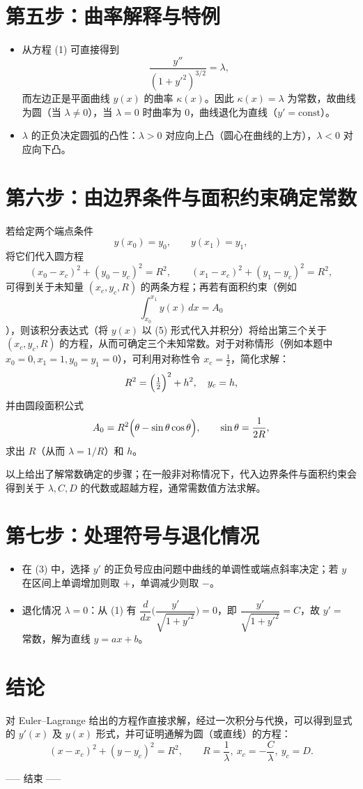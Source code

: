 \documentclass[11pt]{article}
\begin{document}
\section*{第五步：曲率解释与特例}
\begin{itemize}
  \item 从方程 (1) 可直接得到
  \[
  \frac{y''}{(1+y'^2)^{3/2}}=\lambda,
  \]
  而左边正是平面曲线 $y(x)$ 的曲率 $\kappa(x)$。因此 $\kappa(x)=\lambda$ 为常数，故曲线为圆（当 $\lambda\neq0$），当 $\lambda=0$ 时曲率为 $0$，曲线退化为直线（$y'=\text{const}$）。
  \item $\lambda$ 的正负决定圆弧的凸性：$\lambda>0$ 对应向上凸（圆心在曲线的上方），$\lambda<0$ 对应向下凸。
\end{itemize}

\section*{第六步：由边界条件与面积约束确定常数}
若给定两个端点条件
\[
y(x_0)=y_0,\qquad y(x_1)=y_1,
\]
将它们代入圆方程
\[
(x_0-x_c)^2 + (y_0-y_c)^2 = R^2,
\qquad
(x_1-x_c)^2 + (y_1-y_c)^2 = R^2,
\]
可得到关于未知量 $(x_c,y_c,R)$ 的两条方程；再若有面积约束（例如
\[
\int_{x_0}^{x_1} y(x)\,dx = A_0
\]
），则该积分表达式（将 $y(x)$ 以 (5) 形式代入并积分）将给出第三个关于 $(x_c,y_c,R)$ 的方程，从而可确定三个未知常数。对于对称情形（例如本题中 $x_0=0,x_1=1,y_0=y_1=0$），可利用对称性令 $x_c=\tfrac{1}{2}$，简化求解：
\[
R^2=\Bigl(\tfrac{1}{2}\Bigr)^2 + h^2,\quad y_c=h,
\]
并由圆段面积公式
\[
A_0 = R^2\Bigl(\theta - \sin\theta\cos\theta\Bigr),\qquad \sin\theta=\frac{1}{2R},
\]
求出 $R$（从而 $\lambda=1/R$）和 $h$。
\medskip

\noindent 以上给出了解常数确定的步骤；在一般非对称情况下，代入边界条件与面积约束会得到关于 $\lambda,C,D$ 的代数或超越方程，通常需数值方法求解。

\section*{第七步：处理符号与退化情况}
\begin{itemize}
  \item 在 (3) 中，选择 $y'$ 的正负号应由问题中曲线的单调性或端点斜率决定；若 $y$ 在区间上单调增加则取 $+$，单调减少则取 $-$。
  \item 退化情况 $\lambda=0$：从 (1) 有 $\dfrac{d}{dx}\!\bigl(\dfrac{y'}{\sqrt{1+y'^2}}\bigr)=0$，即 $\dfrac{y'}{\sqrt{1+y'^2}}=C$，故 $y'=$ 常数，解为直线 $y=ax+b$。
\end{itemize}

\section*{结论}
对 Euler--Lagrange 给出的方程作直接求解，经过一次积分与代换，可以得到显式的 $y'(x)$ 及 $y(x)$ 形式，并可证明通解为圆（或直线）的方程：
\[
(x-x_c)^2 + (y-y_c)^2 = R^2,
\qquad R=\frac{1}{\lambda},\ x_c=-\frac{C}{\lambda},\ y_c=D.
\]

\vfill
\noindent ----- 结束 -----
\end{document}
